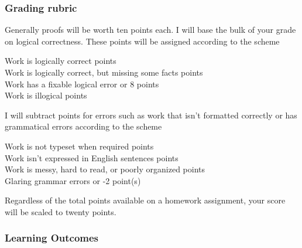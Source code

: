 \documentclass[12pt]{article}
\newcounter{ex}\setcounter{ex}{0}
\newenvironment{mypar}[2]
  {\begin{list}{}%
    {\setlength\leftmargin{#1}
    \setlength\rightmargin{#2}}
    \item[]}
  {\end{list}}
\begin{document}
\subsubsection*{Grading rubric}

Generally proofs will be worth ten points each.  I will base the bulk of your grade 
on logical correctness. These points will be assigned according to the scheme

\begin{mypar}{0.25in}{0.25in}
  {Work is logically correct}   points \\
  {Work is logically correct, but missing some facts}   points \\
  {Work has a fixable logical error}   or 8 points \\
  {Work is illogical}  points
\end{mypar}
I will subtract points for errors such as work that isn't formatted 
correctly or has grammatical errors according to the scheme
\begin{mypar}{0.25in}{0.25in}
  {Work is not typeset when required}   points\\
  {Work isn't expressed in English sentences}   points\\
  {Work is messy, hard to read, or poorly organized}   points \\
  {Glaring grammar errors}   or -2 point(s)  \\
\end{mypar}
Regardless of the total points available on a homework assignment, your score will be scaled to twenty points.




\subsubsection*{Learning Outcomes}
\end{document}
